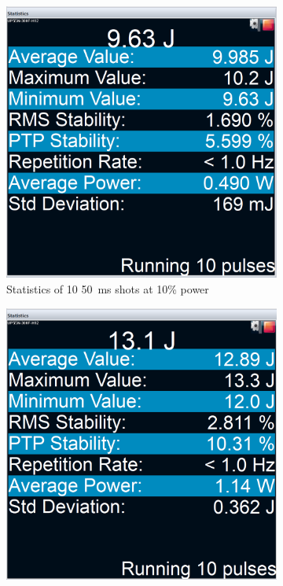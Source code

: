             \begin{figure}[h]
                \centering
                \begin{subfigure}[t]{0.45\textwidth}
                    \centering
                    \includegraphics[width=\textwidth]{assets/4 experiments/10p 50ms Statistics.png}
                    \caption{Statistics of 10 \qty{50}{ms} shots at 10\% power}
                \end{subfigure}
                \hfill
                \begin{subfigure}[t]{0.45\textwidth}
                    \centering
                    \includegraphics[width=\textwidth]{assets/4 experiments/12p 50ms Statistics.png}

\end{subfigure}
\end{figure}
